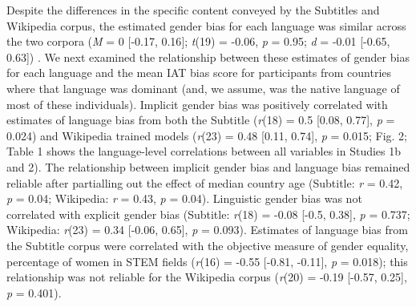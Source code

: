\documentclass[man,floatsintext]{apa6}
\begin{document}
Despite the differences in the specific content conveyed by the Subtitles and Wikipedia corpus, the estimated gender bias for each language was similar across the two corpora (\emph{M} = 0 {[}-0.17, 0.16{]}; \emph{t}(19) = -0.06, \emph{p} = 0.95; \emph{d} = -0.01 {[}-0.65, 0.63{]}) . We next examined the relationship between these estimates of gender bias for each language and the mean IAT bias score for participants from countries where that language was dominant (and, we assume, was the native language of most of these individuals). Implicit gender bias was positively correlated with estimates of language bias from both the Subtitle (\emph{r}(18) = 0.5 {[}0.08, 0.77{]}, \emph{p} = 0.024) and Wikipedia trained models (\emph{r}(23) = 0.48 {[}0.11, 0.74{]}, \emph{p} = 0.015; Fig. 2; Table 1 shows the language-level correlations between all variables in Studies 1b and 2). The relationship between implicit gender bias and language bias remained reliable after partialling out the effect of median country age (Subtitle: \emph{r} = 0.42, \emph{p} = 0.04; Wikipedia: \emph{r} = 0.43, \emph{p} = 0.04). Linguistic gender bias was not correlated with explicit gender bias (Subtitle: \emph{r}(18) = -0.08 {[}-0.5, 0.38{]}, \emph{p} = 0.737; Wikipedia: \emph{r}(23) = 0.34 {[}-0.06, 0.65{]}, \emph{p} = 0.093). Estimates of language bias from the Subtitle corpus were correlated with the objective measure of gender equality, percentage of women in STEM fields (\emph{r}(16) = -0.55 {[}-0.81, -0.11{]}, \emph{p} = 0.018); this relationship was not reliable for the Wikipedia corpus (\emph{r}(20) = -0.19 {[}-0.57, 0.25{]}, \emph{p} = 0.401).

\begingroup\fontsize{6}{8}\selectfont
\end{document}
